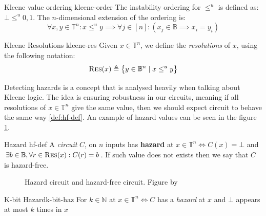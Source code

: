 \begin{definitionbox}{Kleene value ordering \cite{mukaidono_BternaryLogicFunction_1972}}{kleene-order}
    The instability ordering for $\leq^u$ is defined as: $\bot \leq^u 0,1$. The $n$-dimensional
    extension of the ordering is:
    $$
    \forall x,y \in \mathbb{T}^n: x \leq^u y \implies \forall j \in [n]: (x_j \in \mathbb{B} \implies x_i = y_i)
    $$
\end{definitionbox}


\begin{definitionbox}{Kleene Resolutions \cite{mukaidono_BternaryLogicFunction_1972, ikenmeyer_ComplexityHazardfreeCircuits_2019}}{kleene-res}
    Given $x \in \mathbb{T}^n$, we define the \textit{resolutions} of $x$, using the following notation:
    $$
    \textnormal{\textsc{Res}}(x) \triangleq \big\{ y \in \mathbb{B}^n \mid x \leq^u y  \big\}
    $$
\end{definitionbox}

Detecting hazards is a concept that is analysed heavily when talking about Kleene logic.
The idea is ensuring robustness in our circuits, meaning if all resolutions of $x \in \mathbb{T}^n$
give the same value, then we should expect circuit to behave the same way \ref{def:hf-def}.
An example of hazard values can be seen in the figure \ref{fig:hazard-example}.

\begin{definitionbox}{Hazard \cite{ikenmeyer_ComplexityHazardfreeCircuits_2019, eichelberger_HazardDetectionCombinational_1965}}{hf-def}
    A \textit{circuit} $C$, on $n$ inputs has \textbf{hazard} at $x \in \mathbb{T}^n \iff C(x) = \bot$
    and $\exists b \in \mathbb{B}, \forall r \in \textnormal{\textsc{Res}}(x): C(r) = b$. If such value does not exists
    then we say that $C$ is hazard-free.
\end{definitionbox}

\begin{figure}[h!]
    \centering
    \caption{Hazard circuit and hazard-free circuit. Figure by \cite{ikenmeyer_ComplexityHazardfreeCircuits_2019}}\label{fig:hazard-example}
\end{figure}

\begin{definitionbox}{K-bit Hazard}{k-bit-haz}
    For $k \in \mathbb{N}$ at $x \in \mathbb{T}^n \iff C$  has a \textit{hazard} at $x$ and $\bot$ appears at most $k$ times in $x$
\end{definitionbox}
%
%
%
